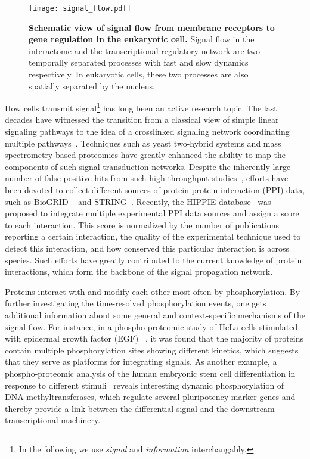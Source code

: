 \begin{figure}[!ht]
\begin{center}
\texttt{[image: signal\_flow.pdf]}
\end{center}
\caption[Signal flow]{{\bf Schematic view of signal flow from membrane 
receptors to gene regulation in the eukaryotic cell.}
Signal flow in the interactome and the transcriptional 
regulatory network are two temporally separated processes 
with
fast and slow dynamics respectively. In eukaryotic cells,
these two processes are also spatially separated by the
nucleus.
}
\label{fig:signal_flow}
\end{figure}

How cells transmit signal\footnote{In the following we
use \emph{signal} and \emph{information} interchangably.} 
has long been an active research topic.
The last decades have witnessed the transition from a classical view of 
simple linear signaling pathways
to the idea of a crosslinked signaling network coordinating multiple 
pathways~\citep{Kholodenko2012}. Techniques such as yeast two-hybrid systems 
and mass spectrometry based
proteomics have greatly enhanced the ability to map the components of such 
signal transduction networks. Despite the inherently large number of false
positive hits from such high-throughput studies~\citep{Mering2002a}, 
efforts have been devoted
to collect different sources of protein-protein interaction 
(PPI) data, such as BioGRID%
~\citep{Stark2006} and STRING~\citep{Szklarczyk2011}. Recently, the HIPPIE
database~\citep{Schaefer2012} was proposed to integrate multiple experimental PPI
data sources and assign a score to each interaction. This
score is normalized by the number of publications reporting 
a certain
interaction, the quality of the experimental technique used
to detect this interaction, and how conserved this particular
interaction is across species. Such efforts have greatly 
contributed to the current knowledge of protein interactions,
which form the backbone of the signal propagation network.

Proteins interact with and modify each other most often by phosphorylation.
By further investigating the time-resolved phosphorylation
events, one gets additional information about some general
and context-specific mechanisms of the signal flow.
For instance, in a phospho-proteomic study of 
HeLa cells stimulated with epidermal growth factor (EGF)~%
\citep{Olsen2006},
it was found that the majority of proteins contain multiple 
phosphorylation sites showing different kinetics, which 
suggests that they serve as platforms for integrating 
signals. As another example, a phospho-proteomic analysis
of the human embryonic stem cell differentiation in response
to different stimuli~\citep{Rigbolt2011} reveals interesting
dynamic phosphorylation of DNA methyltransferases, which
regulate several pluripotency marker genes and thereby 
provide a link between the differential signal and the
downstream transcriptional machinery.

